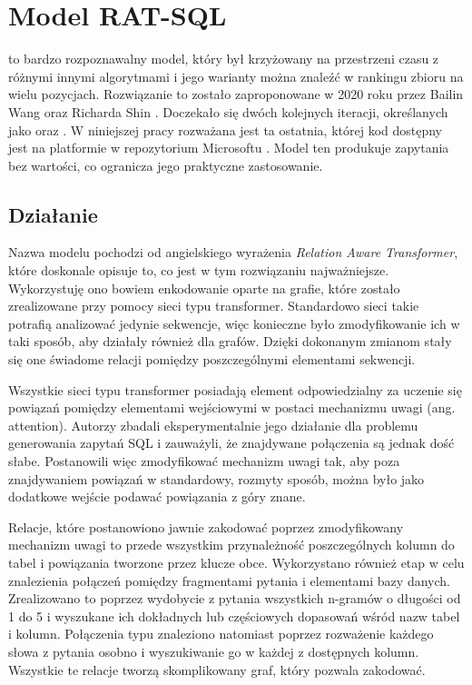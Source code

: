 \section{Model RAT-SQL}
 to bardzo rozpoznawalny model, który był krzyżowany na przestrzeni czasu z różnymi innymi algorytmami i jego warianty można znaleźć w rankingu zbioru  na wielu pozycjach. Rozwiązanie to zostało zaproponowane w 2020 roku przez Bailin Wang oraz Richarda Shin . Doczekało się dwóch kolejnych iteracji, określanych jako  oraz . W niniejszej pracy rozważana jest ta ostatnia, której kod dostępny jest na platformie  w repozytorium Microsoftu . Model ten produkuje zapytania bez wartości, co ogranicza jego praktyczne zastosowanie.

\subsection{Działanie}
Nazwa modelu  pochodzi od angielskiego wyrażenia \textit{Relation Aware Transformer}, które doskonale opisuje to, co jest w tym rozwiązaniu najważniejsze. Wykorzystuję ono bowiem enkodowanie oparte na grafie, które zostało zrealizowane przy pomocy sieci typu transformer. Standardowo sieci takie potrafią analizować jedynie sekwencje, więc konieczne było zmodyfikowanie ich w taki sposób, aby działały również dla grafów. Dzięki dokonanym zmianom stały się one świadome relacji pomiędzy poszczególnymi elementami sekwencji.

Wszystkie sieci typu transformer posiadają element odpowiedzialny za uczenie się powiązań pomiędzy elementami wejściowymi w postaci mechanizmu uwagi (ang. attention). Autorzy \mbox{} zbadali eksperymentalnie jego działanie dla problemu generowania zapytań SQL i zauważyli, że znajdywane połączenia są jednak dość słabe. Postanowili więc zmodyfikować mechanizm uwagi tak, aby poza znajdywaniem powiązań w standardowy, rozmyty sposób, można było jako dodatkowe wejście podawać powiązania z góry znane. 

Relacje, które postanowiono jawnie zakodować poprzez zmodyfikowany mechanizm uwagi to przede wszystkim przynależność poszczególnych kolumn do tabel i powiązania tworzone przez klucze obce. Wykorzystano również etap  w celu znalezienia połączeń pomiędzy fragmentami pytania i elementami bazy danych. Zrealizowano to poprzez wydobycie z pytania wszystkich n-gramów o długości od 1 do 5 i wyszukane ich dokładnych lub częściowych dopasowań wśród nazw tabel i kolumn. Połączenia typu  znaleziono natomiast poprzez rozważenie każdego słowa z pytania osobno i wyszukiwanie go w każdej z dostępnych kolumn. Wszystkie te relacje tworzą skomplikowany graf, który  pozwala zakodować.

